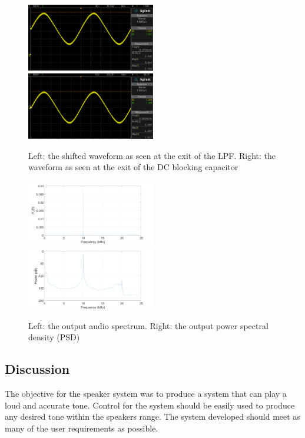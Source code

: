 \documentclass[12pt, a4paper]{article}
\begin{document}
\begin{figure} [!htb]
	\captionsetup{justification=centering}
	\includegraphics[width=0.5\textwidth]{./images/speaker/L_LPF_Output}
	\includegraphics[width=0.5\textwidth]{./images/speaker/L_Shifted_Waveform}
	\caption{Left: the shifted waveform as seen at the exit of the LPF. Right: the waveform as seen at the exit of the DC blocking capacitor}
	\label{fig:L_Shifted_Waveform}
\end{figure}

\begin{figure} [!htb]
	\captionsetup{justification=centering}
	\includegraphics[width=0.5\textwidth]{./images/speaker/L_Output}
	\includegraphics[width=0.5\textwidth]{./images/speaker/L_output_PSD}
	\caption{Left: the output audio spectrum. Right: the output power spectral density (PSD)}
	\label{fig:L_Output}
\end{figure}

\pagebreak
\subsection{Discussion}
The objective for the speaker system was to produce a system that can play a loud and accurate tone. Control for the system should be easily used to produce any desired tone within the speakers range. The system developed should meet as many of the user requirements as possible. \\
\end{document}
